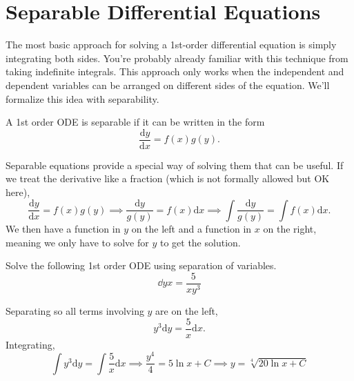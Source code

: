 \section{Separable Differential Equations}
\noindent
The most basic approach for solving a 1st-order differential equation is simply integrating both sides.
You're probably already familiar with this technique from taking indefinite integrals.
This approach only works when the independent and dependent variables can be arranged on different sides of the equation. 
We'll formalize this idea with separability.

\begin{definition}
	A 1st order ODE is separable if it can be written in the form
	\begin{equation*}
		\frac{\mathrm{d} y}{\mathrm{d} x} = f(x)g(y).
	\end{equation*}
\end{definition}

\noindent
Separable equations provide a special way of solving them that can be useful.
If we treat the derivative like a fraction (which is not formally allowed but OK here),
\begin{equation*}
	\frac{\mathrm{d} y}{\mathrm{d} x} = f(x)g(y) \implies \frac{\mathrm{d} y}{g(y)} = f(x) \mathrm{d}x \implies \int{\frac{\mathrm{d} y}{g(y)}} = \int{f(x) \mathrm{d}x}.
\end{equation*}
We then have a function in $y$ on the left and a function in $x$ on the right, meaning we only have to solve for $y$ to get the solution.

\begin{example}
	Solve the following 1st order ODE using separation of variables.
	\begin{equation*}
		\dd{y}{x} = \frac{5}{xy^3}
	\end{equation*}
\end{example}
\noindent
Separating so all terms involving $y$ are on the left,
\begin{equation*}
	y^3 \mathrm{d}y = \frac{5}{x} \mathrm{d}x.
\end{equation*}
Integrating,
\begin{equation*}
	\int{y^3 \mathrm{d}y} = \int{\frac{5}{x} \mathrm{d}x} \implies \frac{y^4}{4} = 5\ln{x} + C \implies y = \sqrt[4]{20\ln{x} + C}
\end{equation*}

